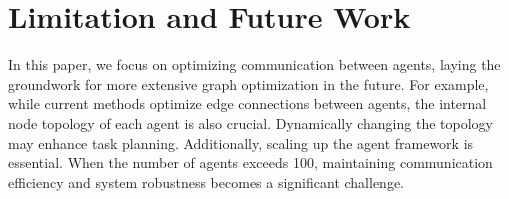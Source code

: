 \documentclass{article}
\theoremstyle{plain}
\theoremstyle{definition}
\theoremstyle{remark}
\begin{document}
\section{Limitation and Future Work}

In this paper, we focus on optimizing communication between agents, laying the groundwork for more extensive graph optimization in the future.
For example, while current methods optimize edge connections between agents, the internal node topology of each agent is also crucial.
Dynamically changing the topology may enhance task planning.
Additionally, scaling up the agent framework is essential.
When the number of agents exceeds 100, maintaining communication efficiency and system robustness becomes a significant challenge.
\end{document}
